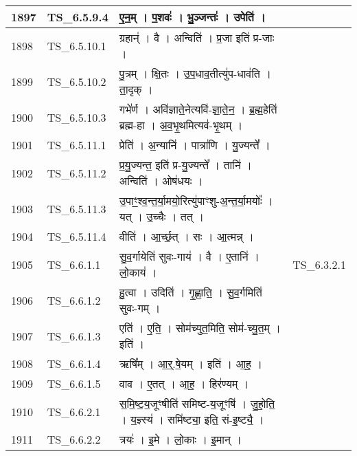\documentclass[17pt]{extarticle}
\begin{document}
\begin{longtable}{||p{0.4in}||p{0.9in}||p{4.0in}||p{0.9in}||}
        \hline
            1897 & TS\_6.5.9.4 & ए॒न॒म्   ।   प॒शवः॑   ।   भु॒ञ्जन्तः॑   ।   उपेति॑   ।    &      \\
        \hline
            1898 & TS\_6.5.10.1 & ग्रहान्॑   ।   वै   ।   अन्विति॑   ।   प्र॒जा इति॑ प्र{-}जाः   ।    &      \\
        \hline
            1899 & TS\_6.5.10.2 & पु॒त्रम्   ।   क्षि॒तः   ।   उ॒प॒धाव॒तीत्यु॑प{-}धाव॑ति   ।   ता॒दृक्   ।    &      \\
        \hline
            1900 & TS\_6.5.10.3 & गभे॑र्ण   ।   अवि॑ज्ञाते॒नेत्यवि॑{-}ज्ञा॒ते॒न॒   ।   ब्र॒ह्म॒हेति॑ ब्रह्म{-}हा   ।   अ॒व॒भृ॒थमित्यव॑{-}भृ॒थम्   ।    &      \\
        \hline
            1901 & TS\_6.5.11.1 & प्रेति॑   ।   अ॒न्यानि॑   ।   पात्रा॑णि   ।   यु॒ज्यन्ते᳚   ।    &      \\
        \hline
            1902 & TS\_6.5.11.2 & प्र॒यु॒ज्यन्त॒ इति॑ प्र{-}यु॒ज्यन्ते᳚   ।   तानि॑   ।   अन्विति॑   ।   ओष॑धयः   ।    &      \\
        \hline
            1903 & TS\_6.5.11.3 & उ॒पाꣳ॒॒श्व॒न्त॒र्या॒मयो॒रित्यु॑पाꣳशु{-}अ॒न्त॒र्या॒मयोः᳚   ।   यत्   ।   उ॒च्चैः   ।   तत्   ।    &      \\
        \hline
            1904 & TS\_6.5.11.4 & वीति॑   ।   आ॒र्च्छ॒त्   ।   सः   ।   आ॒त्मन्न्   ।    &      \\
        \hline
            1905 & TS\_6.6.1.1 & सु॒व॒र्गायेति॑ सुवः{-}गाय॑   ।   वै   ।   ए॒तानि॑   ।   लो॒काय॑   ।    & TS\_6.3.2.1        \\
        \hline
            1906 & TS\_6.6.1.2 & हु॒त्वा   ।   उदिति॑   ।   गृ॒ह्णा॒ति॒   ।   सु॒व॒र्गमिति॑ सुवः{-}गम्   ।    &      \\
        \hline
            1907 & TS\_6.6.1.3 & एति॑   ।   ए॒ति॒   ।   सोम॑च्युत॒मिति॒ सोम॑{-}च्यु॒त॒म्   ।   इति॑   ।    &      \\
        \hline
            1908 & TS\_6.6.1.4 & ऋषि᳚म्   ।   आ॒र्॒.षे॒यम्   ।   इति॑   ।   आ॒ह॒   ।    &      \\
        \hline
            1909 & TS\_6.6.1.5 & वाव   ।   ए॒तत्   ।   आ॒ह॒   ।   हिर॑ण्यम्   ।    &      \\
        \hline
            1910 & TS\_6.6.2.1 & स॒मि॒ष्ट॒य॒जूꣳषीति॑ समिष्ट{-}य॒जूꣳषि॑   ।   जु॒हो॒ति॒   ।   य॒ज्ञ्स्य॑   ।   समि॑ष्ट्या॒ इति॒ सं{-}इ॒ष्ट्यै॒   ।    &      \\
        \hline
            1911 & TS\_6.6.2.2 & त्रयः॑   ।   इ॒मे   ।   लो॒काः   ।   इ॒मान्   ।    &      \\

\end{longtable}
\end{document}
